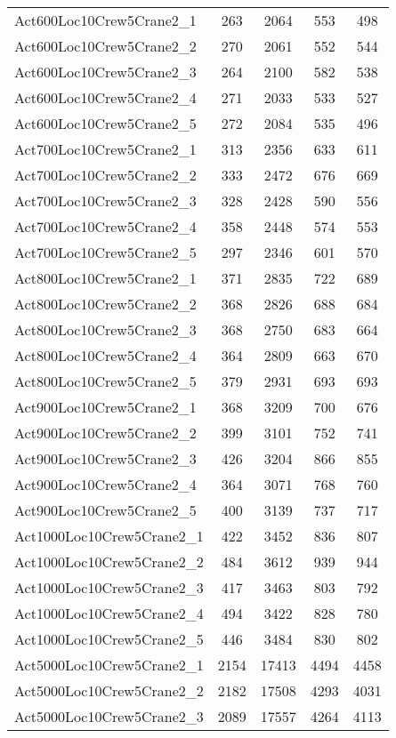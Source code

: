 \begin{center}
\begin{longtable}{ | l | c | c | c | c | }
Act600Loc10Crew5Crane2\_1	&	263	&	2064	&	553	&	498	\\
Act600Loc10Crew5Crane2\_2	&	270	&	2061	&	552	&	544	\\
Act600Loc10Crew5Crane2\_3	&	264	&	2100	&	582	&	538	\\
Act600Loc10Crew5Crane2\_4	&	271	&	2033	&	533	&	527	\\
Act600Loc10Crew5Crane2\_5	&	272	&	2084	&	535	&	496	\\
Act700Loc10Crew5Crane2\_1	&	313	&	2356	&	633	&	611	\\
Act700Loc10Crew5Crane2\_2	&	333	&	2472	&	676	&	669	\\
Act700Loc10Crew5Crane2\_3	&	328	&	2428	&	590	&	556	\\
Act700Loc10Crew5Crane2\_4	&	358	&	2448	&	574	&	553	\\
Act700Loc10Crew5Crane2\_5	&	297	&	2346	&	601	&	570	\\
Act800Loc10Crew5Crane2\_1	&	371	&	2835	&	722	&	689	\\
Act800Loc10Crew5Crane2\_2	&	368	&	2826	&	688	&	684	\\
Act800Loc10Crew5Crane2\_3	&	368	&	2750	&	683	&	664	\\
Act800Loc10Crew5Crane2\_4	&	364	&	2809	&	663	&	670	\\
Act800Loc10Crew5Crane2\_5	&	379	&	2931	&	693	&	693	\\
Act900Loc10Crew5Crane2\_1	&	368	&	3209	&	700	&	676	\\
Act900Loc10Crew5Crane2\_2	&	399	&	3101	&	752	&	741	\\
Act900Loc10Crew5Crane2\_3	&	426	&	3204	&	866	&	855	\\
Act900Loc10Crew5Crane2\_4	&	364	&	3071	&	768	&	760	\\
Act900Loc10Crew5Crane2\_5	&	400	&	3139	&	737	&	717	\\
Act1000Loc10Crew5Crane2\_1	&	422	&	3452	&	836	&	807	\\
Act1000Loc10Crew5Crane2\_2	&	484	&	3612	&	939	&	944	\\
Act1000Loc10Crew5Crane2\_3	&	417	&	3463	&	803	&	792	\\
Act1000Loc10Crew5Crane2\_4	&	494	&	3422	&	828	&	780	\\
Act1000Loc10Crew5Crane2\_5	&	446	&	3484	&	830	&	802	\\
Act5000Loc10Crew5Crane2\_1	&	2154	&	17413	&	4494	&	4458	\\
Act5000Loc10Crew5Crane2\_2	&	2182	&	17508	&	4293	&	4031	\\
Act5000Loc10Crew5Crane2\_3	&	2089	&	17557	&	4264	&	4113	\\

\end{longtable}
\end{center}
